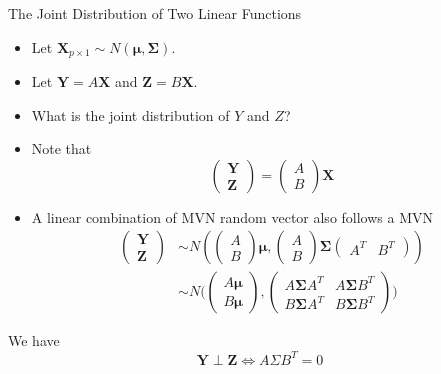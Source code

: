 \documentclass[
  ignorenonframetext,
]{beamer}
\providecommand{\tightlist}{%
  \setlength{\itemsep}{0pt}\setlength{\parskip}{0pt}}
\begin{document}
\begin{frame}{The Joint Distribution of Two Linear Functions}
\protect\hypertarget{the-joint-distribution-of-two-linear-functions}{}
\begin{itemize}
\tightlist
\item
  Let
  \(\mathbf{X}_{p\times 1}\sim N(\boldsymbol \mu, \boldsymbol \Sigma)\).
\item
  Let \(\mathbf Y=A \mathbf X\) and \(\mathbf Z=B \mathbf X\).
\item
  What is the joint distribution of \(Y\) and \(Z\)?
\item
  Note that \[\begin{pmatrix}
  \mathbf Y\\ \mathbf Z
  \end{pmatrix}=\begin{pmatrix}A \\ B\end{pmatrix}\mathbf X
  \]
\item
  A linear combination of MVN random vector also follows a MVN
  \[\begin{aligned}
  \begin{pmatrix}\mathbf Y\\ \mathbf Z\end{pmatrix} 
  & \sim N(\begin{pmatrix}A \\ B\end{pmatrix}\boldsymbol \mu, \begin{pmatrix}A \\ B\end{pmatrix}\boldsymbol \Sigma \begin{pmatrix}A^T & B^T\end{pmatrix})\\
  &\sim N(\begin{pmatrix}A \boldsymbol \mu \\ B\boldsymbol \mu \end{pmatrix}, \begin{pmatrix}A \boldsymbol \Sigma A^T & A \boldsymbol \Sigma B^T\\ B \boldsymbol \Sigma A^T & B \boldsymbol \Sigma B^T \end{pmatrix}\boldsymbol)
  \end{aligned} 
  \]
\end{itemize}

We have \[\mathbf Y \perp \mathbf Z \Leftrightarrow A\Sigma B^T=0\]
\end{frame}
\end{document}
